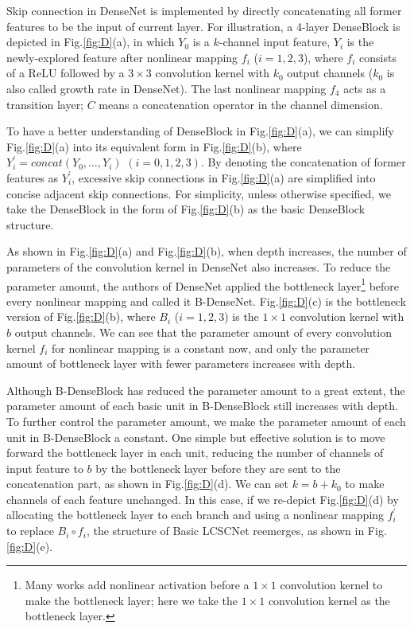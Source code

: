 \documentclass[journal]{IEEEtran}
\begin{document}
Skip connection in DenseNet is implemented by directly concatenating all former features to be the input of current layer. For illustration, a 4-layer DenseBlock is depicted in Fig.\ref{fig:D}(a), in which $Y_{0}$ is a $k$-channel input feature, $Y_{i}$ is the newly-explored feature after nonlinear mapping $f_{i}$ ($i=1,2,3$), where $f_{i}$ consists of a ReLU followed by a $3\times 3$ convolution kernel with $k_{0}$ output channels ($k_{0}$ is also called growth rate in DenseNet). The last nonlinear mapping $f_{4}$ acts as a transition layer; $C$ means a concatenation operator in the channel dimension.

To have a better understanding of DenseBlock in Fig.\ref{fig:D}(a), we can simplify Fig.\ref{fig:D}(a) into its equivalent form in Fig.\ref{fig:D}(b), where $Y_{i}^{'}=concat(Y_{0},\dots,Y_{i})$ $(i=0,1,2,3)$. By denoting the concatenation of former features as $Y_{i}^{'}$, excessive skip connections in Fig.\ref{fig:D}(a) are simplified into concise adjacent skip connections. For simplicity, unless otherwise specified, we take the DenseBlock in the form of Fig.\ref{fig:D}(b) as the basic DenseBlock structure.

As shown in Fig.\ref{fig:D}(a) and Fig.\ref{fig:D}(b), when depth increases, the number of parameters of the convolution kernel in DenseNet also increases. To reduce the parameter amount, the authors of DenseNet applied the bottleneck layer\footnote{Many works add nonlinear activation before a $1\times 1$ convolution kernel to make the bottleneck layer; here we take the $1\times 1$ convolution kernel as the bottleneck layer.} before every nonlinear mapping and called it B-DenseNet. Fig.\ref{fig:D}(c) is the bottleneck version of Fig.\ref{fig:D}(b), where $B_{i}$ ($i=1,2,3$) is the $1\times 1$ convolution kernel with $b$ output channels. We can see that the parameter amount of every convolution kernel $f_{i}$ for nonlinear mapping is a constant now, and only the parameter amount of bottleneck layer with fewer parameters increases with depth. 

Although B-DenseBlock has reduced the parameter amount to a great extent, the parameter amount of each basic unit in B-DenseBlock still increases with depth. To further control the parameter amount, we make the parameter amount of each unit in B-DenseBlock a constant. One simple but effective solution is to move forward the bottleneck layer in each unit, reducing the number of channels of input feature to $b$ by the bottleneck layer before they are sent to the concatenation part, as shown in Fig.\ref{fig:D}(d). We can set $k=b+k_{0}$ to make channels of each feature unchanged. In this case, if we re-depict Fig.\ref{fig:D}(d) by allocating the bottleneck layer to each branch and using a nonlinear mapping $f_{i}^{'}$ to replace $B_{i} \circ f_{i}$, the structure of Basic LCSCNet reemerges, as shown in Fig.\ref{fig:D}(e). 
\end{document}
